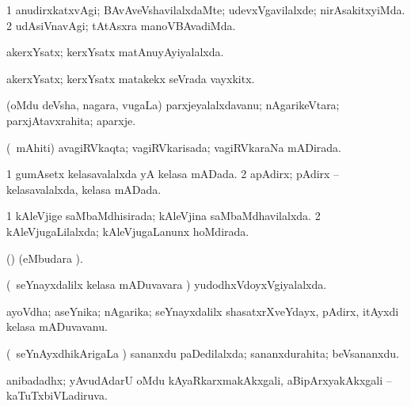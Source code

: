 \bentry
{}
\gl{\kirxvi}
\bmng
\bnum
\num{1} anudirxkatxvAgi; BAvAveVshavilalxdaMte; udevxVgavilalxde; nirAsakitxyiMda. 
\num{2} udAsiVnavAgi; tAtAsxra manoVBAvadiMda. 
\enum
\emng
\eentry

\bentry
{}
\gl{\gu}
\bmng
akerxYsatx; kerxYsatx matAnuyAyiyalalxda. 
\emng
\eentry

\bentry
{}
\gl{\nA}
\bmng
akerxYsatx; kerxYsatx matakekx seVrada vayxkitx. 
\emng
\eentry

\bentry
{}
\gl{\nA}
\bmng
(oMdu deVsha, nagara, \mo vugaLa) parxjeyalalxdavanu; nAgarikeVtara; parxjAtavxrahita; aparxje. 
\emng
\eentry

\bentry
{}
\gl{\gu}
\bmng
(\kanmu\ mAhiti) avagiRVkaqta; vagiRVkarisada; vagiRVkaraNa mADirada. 
\emng
\eentry

\bentry
{}
\gl{\gu}
\bmng
\bnum
\num{1} gumAsetx kelasavalalxda yA kelasa mADada. 
\num{2} apAdirx; pAdirx -- kelasavalalxda, kelasa mADada. 
\enum
\emng
\eentry

\bentry
{}
\gl{\gu}
\bmng
\bnum
\num{1} kAleVjige saMbaMdhisirada; kAleVjina saMbaMdhavilalxda. 
\num{2} kAleVjugaLilalxda; kAleVjugaLanunx hoMdirada. 
\enum
\emng
\eentry

\bentry
{}
\gl{\nA}
\bmng
(\AmA) (eMbudara \saMkiSx). 
\emng
\eentry

\bentry
{}
\gl{\gu}
\bmng
(\kanmu\ seYnayxdalilx kelasa mADuvavara \vi) yudodhxVdoyxVgiyalalxda. 
\emng
\eentry

\bentry
{}
\gl{\nA}
\bmng
ayoVdha; aseYnika; nAgarika; seYnayxdalilx shasatxrXveYdayx, pAdirx, itAyxdi kelasa mADuvavanu. 
\emng
\eentry

\bentry
{}
\gl{\gu}
\bmng
(\kanmu\ seYnAyxdhikArigaLa \vi) sananxdu paDedilalxda; sananxdurahita; beVsananxdu. 
\emng
\eentry

\bentry
{}
\gl{\gu}
\bmng
anibadadhx; yAvudAdarU oMdu kAyaRkarxmakAkxgali, aBipArxyakAkxgali -- kaTuTxbiVLadiruva. 
\emng
\eentry

